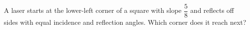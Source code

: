 A laser starts at the lower-left corner of a square with slope $\dfrac{5}{8}$ and reflects off sides with equal incidence and reflection angles. Which corner does it reach next?
